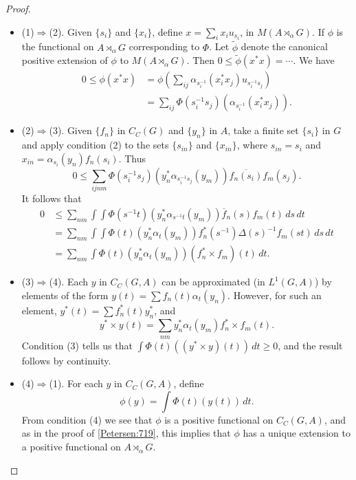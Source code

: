\documentclass{book}
\begin{document}
\begin{proof}
  \begin{itemize}
    \item (1)\(\Rightarrow\)(2). Given \(\{s_i\}\) and \(\{x_i\}\), define \(x=\sum_i x_i u_{s_i}\), in \(M(A\rtimes_\alpha G)\).
      If \(\phi\) is the functional on \(A\rtimes_\alpha G\) corresponding to \(\Phi\).
      Let \(\widetilde\phi\) denote the canonical positive extension of
      \(\phi\) to \(M(A\rtimes_\alpha G)\). Then
      \(0\leq\widetilde\phi(x^*x)=\cdots\).
      We have
      \begin{align*}
        0\leq\phi(x^* x)&=\phi\left(\sum_{ij}\alpha_{s_i^{-1}}(x_i^* x_j)u_{s_i^{-1}s_j}\right)\\
        &=\sum_{ij}\Phi(s_i^{-1}s_j)(\alpha_{s_i^{-1}}(x_i^* x_j)).
      \end{align*}
    \item (2)\(\Rightarrow\)(3). Given \(\{f_n\}\) in \(C_C(G)\) and \(\{y_n\}\) in \(A\), take a finite set \(\{s_i\}\) in \(G\)
      and apply condition (2) to the sets \(\{s_{in}\}\) and \(\{x_{in}\}\), where \(s_{in}=s_i\) and \(x_{in}=\alpha_{s_i}(y_n)f_n(s_i)\). Thus
      \[
        0\leq\sum_{ijnm}\Phi(s_i^{-1}s_j)(y^*_n\alpha_{s_i^{-1}s_j}(y_m))\overline{f_n(s_i)}f_m(s_j).
      \]
      It follows that 
      \begin{align*}
        0&\leq\sum_{nm}\int\int\Phi(s^{-1}t)(y^*_n\alpha_{s^{-1}t}(y_m))\overline{f}_n(s)f_m(t)\,ds\,dt\\
        &=\sum_{nm}\int\int\Phi(t)(y^*_n\alpha_t(y_m))f_n^*(s^{-1}){\Delta(s)}^{-1}f_m(st)\,ds\,dt\\
        &=\sum_{nm}\int\Phi(t)(y^*_n\alpha_t(y_m))(f_n^*\times f_m)(t)\,dt.
      \end{align*}
    \item (3)\(\Rightarrow\)(4). Each \(y\) in \(C_C(G,A)\) can be approximated (in \(L^1(G,A)\)) by elements of 
      the form \(y(t)=\sum f_n(t)\alpha_t(y_n)\). However, for such an element, \(y^*(t)=\sum f_n^*(t)y_n^*\), and
      \[
        y^*\times y(t)=\sum_{nm} y^*_n\alpha_t(y_m)f_n^*\times f_m(t).
      \]
      Condition (3) tells us that \(\int\Phi(t)((y^*\times y)(t))\,dt\geq 0\), and the result follows by continuity.
    \item (4)\(\Rightarrow\)(1). For each \(y\) in \(C_C(G,A)\), define
      \[  
        \phi(y)=\int\Phi(t)(y(t))\,dt.
      \] 
      From condition (4) we see that \(\phi\) is a positive functional on \(C_C(G,A)\), and as in the proof of \ref{Petersen:719}, this implies
      that \(\phi\) has a unique extension to a positive functional on \(A\rtimes_\alpha G\).
  \end{itemize}
\end{proof}
\end{document}
